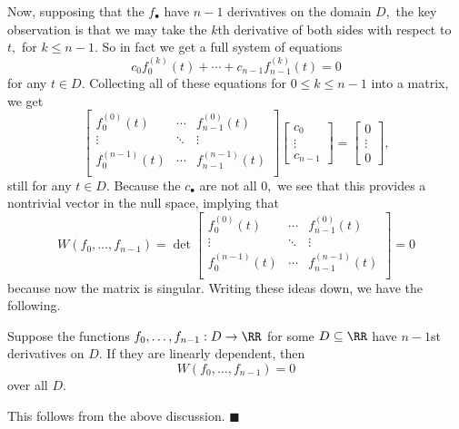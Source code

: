 Now, supposing that the $f_\bullet$ have $n-1$ derivatives on the domain $D,$ the key observation is that we may take the $k$th derivative of both sides with respect to $t,$ for $k\le n-1.$ So in fact we get a full system of equations
\[c_0f_0^{(k)}(t)+\cdots+c_{n-1}f_{n-1}^{(k)}(t)=0\]
for any $t\in D.$ Collecting all of these equations for $0\le k\le n-1$ into a matrix, we get
\[\begin{bmatrix}
    f_0^{(0)}(t) & \cdots & f_{n-1}^{(0)}(t) \\
    \vdots & \ddots & \vdots \\
    f_0^{(n-1)}(t) & \cdots & f_{n-1}^{(n-1)}(t) \\
\end{bmatrix}\begin{bmatrix}c_0 \\ \vdots \\ c_{n-1}\end{bmatrix}=\begin{bmatrix}0 \\ \vdots \\ 0\end{bmatrix},\]
still for any $t\in D.$ Because the $c_\bullet$ are not all $0,$ we see that this provides a nontrivial vector in the null space, implying that
\[W(f_0,\ldots,f_{n-1})=\det\begin{bmatrix}
    f_0^{(0)}(t) & \cdots & f_{n-1}^{(0)}(t) \\
    \vdots & \ddots & \vdots \\
    f_0^{(n-1)}(t) & \cdots & f_{n-1}^{(n-1)}(t) \\
\end{bmatrix}=0\]
because now the matrix is singular. Writing these ideas down, we have the following.
\begin{proposition}
    Suppose the functions $f_0,\ldots,f_{n-1}:D\to\RR$ for some $D\subseteq\RR$ have $n-1$st derivatives on $D.$ If they are linearly dependent, then
    \[W(f_0,\ldots,f_{n-1})=0\]
    over all $D.$
\end{proposition}
This follows from the above discussion. $\blacksquare$


